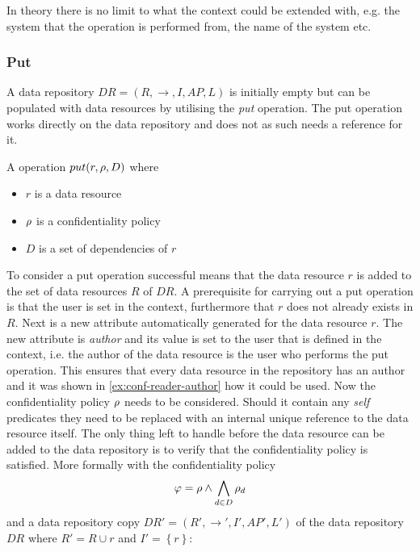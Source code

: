 In theory there is no limit to what the context could be extended with, e.g. the system that the operation is performed from, the name of the system etc.

\subsubsection{Put}\label{sec:put}
A data repository $DR=\left(R, \longrightarrow, I, AP, L \right)$ is initially empty but can be populated with data resources by utilising the \emph{put} operation. The put operation works directly on the data repository and does not as such needs a reference for it.
\begin{definition}
A operation $put(r, \rho, D)$ where
\begin{itemize}
  \item $r$ is a data resource
  \item $\rho$ is a confidentiality policy
  \item $D$ is a set of dependencies of $r$
\end{itemize}
\end{definition}
To consider a put operation successful means that the data resource $r$ is added to the set of data resources $R$ of $DR$. A prerequisite for carrying out a put operation is that the user is set in the context, furthermore that $r$ does not already exists in $R$. Next is a new attribute automatically generated for the data resource $r$. The new attribute is \emph{author} and its value is set to the user that is defined in the context, i.e. the author of the data resource is the user who performs the put operation. This ensures that every data resource in the repository has an author and it was shown in \autoref{ex:conf-reader-author} how it could be used. Now the confidentiality policy $\rho$ needs to be considered. Should it contain any \emph{self} predicates they need to be replaced with an internal unique reference to the data resource itself. The only thing left to handle before the data resource can be added to the data repository is to verify that the confidentiality policy is satisfied. More formally with the confidentiality policy $$\varphi = \rho \land \bigwedge\limits_{d \in D} \rho_d$$ and a data repository copy $DR' = \left(R', \longrightarrow', I', AP', L' \right)$ of the data repository $DR$ where $R' = R \cup r$ and $I' = \left\{ r \right\}$:
